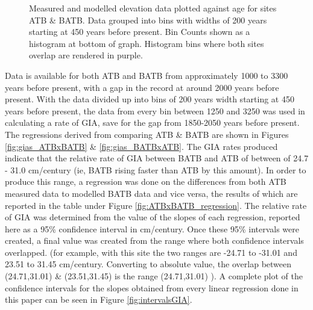 \begin{figure}[H]
	\caption{Measured and modelled elevation data plotted against age for sites ATB \& BATB. Data grouped into bins with widths of 200 years starting at 450 years before present. Bin Counts shown as a histogram at bottom of graph. Histogram bins where both sites overlap are rendered in purple.}
	\label{fig:data_ATBxBATB}
\end{figure}
 Data is available for both ATB and BATB from
 approximately 1000 to 3300 years before present,
 with a gap in the record at around 2000 years before present. With the data divided up into bins of 200 years width
 starting at 450 years before present, the data from every bin between 1250 and 3250 was used
 in calculating a rate of GIA, save for the gap from 1850-2050 years before
 present. The regressions derived from comparing ATB \& BATB are shown
 in Figures \ref{fig:gias_ATBxBATB} \& \ref{fig:gias_BATBxATB}. The GIA rates produced
  indicate that the relative rate of GIA between BATB and ATB of
 between of 24.7 - 31.0 cm/century (ie, BATB rising faster than ATB by this amount). In order to produce this range, a
 regression was done on the differences from both ATB measured data to modelled
 BATB data and vice versa, the results of which are reported in
 the table under Figure \ref{fig:ATBxBATB_regression}. The relative rate of GIA was determined from the
 value of the slopes of each regression, reported here as a 95\% confidence interval
 in cm/century. Once these 95\% intervals were created, a final value was created
 from the range where both confidence intervals overlapped. (for example, with this
 site the two ranges are -24.71 to -31.01 and 23.51 to 31.45 cm/century. Converting
 to absolute value, the overlap between (24.71,31.01) \& (23.51,31.45) is the range
 (24.71,31.01) ). A complete plot of the confidence intervals
 for the slopes obtained from every linear regression done in this paper can be seen in Figure \ref{fig:intervalsGIA}. \\


